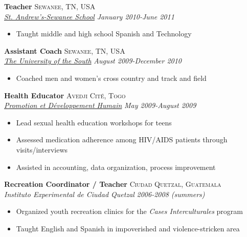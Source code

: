 \documentclass[11pt]{article}
\begin{document}
\noindent \textbf{Teacher} \hfill \textsc{Sewanee, TN, USA}\\
\noindent \emph{\href{http://www.sasweb.org/}{St. Andrew's-Sewanee School}} \hfill \emph{January 2010-June 2011}
\vspace{-2mm}
\begin{itemize}\itemsep0pt \parskip0pt 
\item Taught middle and high school Spanish and Technology
\end{itemize}

\noindent \textbf{Assistant Coach} \hfill \textsc{Sewanee, TN, USA}\\
\noindent \emph{\href{http://sewanee.edu/}{The University of the South}} \hfill \emph{August 2009-December 2010}
\vspace{-2mm}
\begin{itemize}\itemsep0pt \parskip0pt 
\item Coached men and women's cross country and track and field
\end{itemize}

\noindent \textbf{Health Educator} \hfill \textsc{Avedji Cité, Togo}\\
\noindent \emph{\href{http://www.pdh-togo.org/html/english/welcome.html}{Promotion et Développement Humain}} \hfill \emph{May 2009-August 2009}
\vspace{-2mm}
\begin{itemize}\itemsep0pt \parskip0pt 
\item Lead sexual health education workshops for teens
\item Assessed medication adherence among HIV/AIDS patients through visits/interviews
\item Assisted in accounting, data organization, process improvement

\end{itemize}

\noindent \textbf{Recreation Coordinator / Teacher} \hfill \textsc{Ciudad Quetzal, Guatemala}\\
\noindent \emph{Instituto Experimental de Ciudad Quetzal} \hfill \emph{2006-2008 (summers)}
\vspace{-2mm}
\begin{itemize}\itemsep0pt \parskip0pt 
\item Organized youth recreation clinics for the \textit{Cases Interculturales} program
\item Taught English and Spanish in impoverished and violence-stricken area
\end{itemize}
\end{document}
